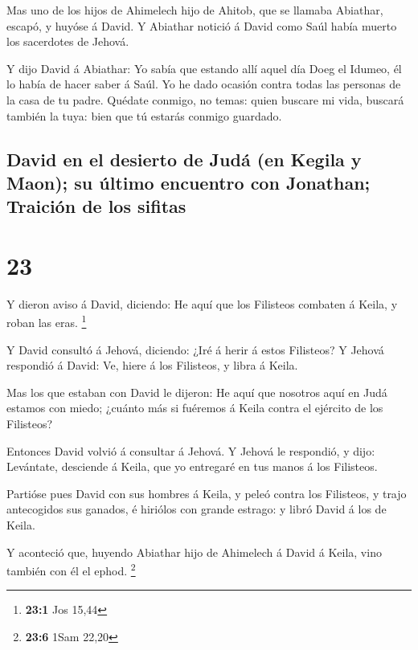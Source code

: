  Mas uno de los hijos de Ahimelech hijo de Ahitob, que se
llamaba Abiathar, escapó, y huyóse á David.  Y Abiathar
notició á David como Saúl había muerto los sacerdotes de Jehová.

 Y dijo David á Abiathar: Yo sabía que estando allí aquel
día Doeg el Idumeo, él lo había de hacer saber á Saúl. Yo he dado
ocasión contra todas las personas de la casa de tu padre.
 Quédate conmigo, no temas: quien buscare mi vida,
buscará también la tuya: bien que tú estarás conmigo guardado.

\hypertarget{david-en-el-desierto-de-juduxe1-en-kegila-y-maon-su-uxfaltimo-encuentro-con-jonathan-traiciuxf3n-de-los-sifitas}{%
\subsection{David en el desierto de Judá (en Kegila y Maon); su último
encuentro con Jonathan; Traición de los
sifitas}\label{david-en-el-desierto-de-juduxe1-en-kegila-y-maon-su-uxfaltimo-encuentro-con-jonathan-traiciuxf3n-de-los-sifitas}}

\hypertarget{section-22}{%
\section{23}\label{section-22}}

 Y dieron aviso á David, diciendo: He aquí que los
Filisteos combaten á Keila, y roban las eras. \footnote{\textbf{23:1}
  Jos 15,44}

 Y David consultó á Jehová, diciendo: ¿Iré á herir á estos
Filisteos? Y Jehová respondió á David: Ve, hiere á los Filisteos, y
libra á Keila.

 Mas los que estaban con David le dijeron: He aquí que
nosotros aquí en Judá estamos con miedo; ¿cuánto más si fuéremos á Keila
contra el ejército de los Filisteos?

 Entonces David volvió á consultar á Jehová. Y Jehová le
respondió, y dijo: Levántate, desciende á Keila, que yo entregaré en tus
manos á los Filisteos.

 Partióse pues David con sus hombres á Keila, y peleó
contra los Filisteos, y trajo antecogidos sus ganados, é hiriólos con
grande estrago: y libró David á los de Keila.

 Y aconteció que, huyendo Abiathar hijo de Ahimelech á
David á Keila, vino también con él el ephod. \footnote{\textbf{23:6}
  1Sam 22,20}

